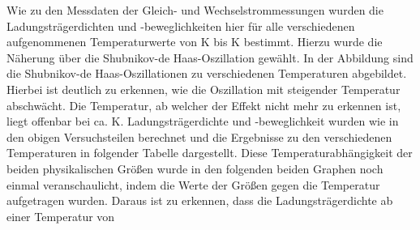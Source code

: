 

Wie zu den Messdaten der Gleich- und Wechselstrommessungen wurden die Ladungsträgerdichten und -beweglichkeiten hier für alle verschiedenen aufgenommenen Temperaturwerte von \unit[2]{K} bis \unit[40]{K} bestimmt. Hierzu wurde die Näherung über die Shubnikov-de Haas-Oszillation gewählt. %
In der Abbildung %
sind die Shubnikov-de Haas-Oszillationen zu verschiedenen Temperaturen abgebildet. Hierbei ist deutlich zu erkennen, wie die Oszillation mit steigender Temperatur abschwächt. %
Die Temperatur, ab welcher der Effekt nicht mehr zu erkennen ist, liegt offenbar bei ca. \unit[15]{K}.%
Ladungsträgerdichte und -beweglichkeit wurden wie in den obigen Versuchsteilen berechnet und die Ergebnisse zu den verschiedenen Temperaturen in folgender Tabelle dargestellt. %
Diese Temperaturabhängigkeit der beiden physikalischen Größen wurde in den folgenden beiden Graphen noch einmal veranschaulicht, indem die Werte der Größen gegen die Temperatur aufgetragen wurden. %
Daraus ist zu erkennen, dass die Ladungsträgerdichte ab einer Temperatur von %




